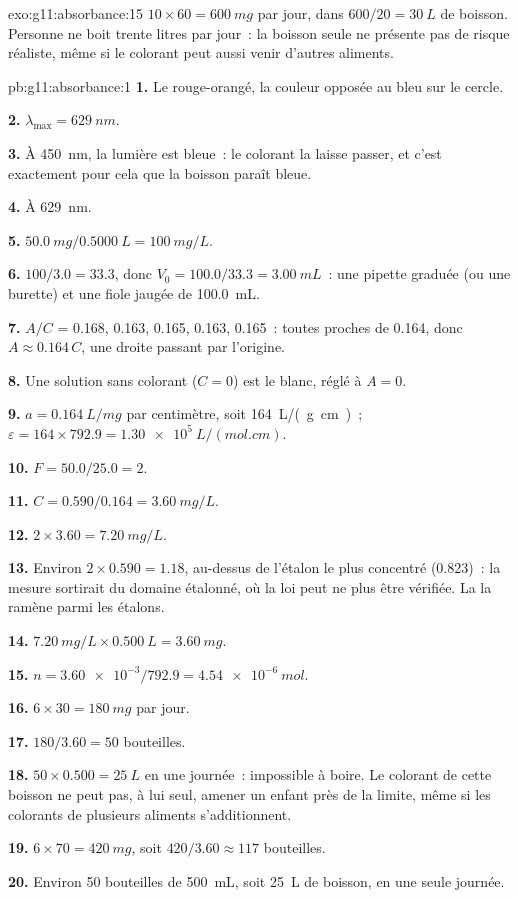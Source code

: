 \begin{solution}{exo:g11:absorbance:15}
$10 \times 60 = \qty{600}{mg}$ par jour, dans $600 / 20 = \qty{30}{L}$ de
boisson. Personne ne boit trente litres par jour~: la boisson seule ne
présente pas de risque réaliste, même si le colorant peut aussi venir
d'autres aliments.
\end{solution}

\begin{solution}{pb:g11:absorbance:1}
\textbf{1.} Le rouge-orangé, la couleur opposée au bleu sur le cercle.

\textbf{2.} $\lambda_{\max} = \qty{629}{nm}$.

\textbf{3.} À \qty{450}{nm}, la lumière est bleue~: le colorant la
laisse passer, et c'est exactement pour cela que la boisson paraît bleue.

\textbf{4.} À \qty{629}{nm}.

\textbf{5.} $\qty{50.0}{mg} / \qty{0.5000}{L} = \qty{100}{mg/L}$.

\textbf{6.}  $100 / 3.0 = 33.3$, donc
$V_0 = 100.0 / 33.3 = \qty{3.00}{mL}$~: une pipette graduée (ou une
burette) et une fiole jaugée de \qty{100.0}{mL}.

\textbf{7.} $A/C$ = 0.168, 0.163, 0.165, 0.163, 0.165~: toutes proches
de 0.164, donc $A \approx 0.164\, C$, une droite passant par l'origine.

\textbf{8.} Une solution sans colorant ($C = 0$) est le blanc, réglé à
$A = 0$.

\textbf{9.} $a = \qty{0.164}{L/mg}$ par centimètre, soit
\qty{164}{L/(g.cm)}~; $\varepsilon = 164 \times 792.9 =
\qty{1.30e5}{L/(mol.cm)}$.

\textbf{10.} $F = 50.0 / 25.0 = 2$.

\textbf{11.} $C = 0.590 / 0.164 = \qty{3.60}{mg/L}$.

\textbf{12.} $2 \times 3.60 = \qty{7.20}{mg/L}$.

\textbf{13.} Environ $2 \times 0.590 = 1.18$, au-dessus de l'étalon le
plus concentré (0.823)~: la mesure sortirait du domaine étalonné, où la
loi peut ne plus être vérifiée. La  la ramène parmi les
étalons.

\textbf{14.} $\qty{7.20}{mg/L} \times \qty{0.500}{L} = \qty{3.60}{mg}$.

\textbf{15.} $n = \num{3.60e-3} / 792.9 = \qty{4.54e-6}{mol}$.

\textbf{16.} $6 \times 30 = \qty{180}{mg}$ par jour.

\textbf{17.} $180 / 3.60 = 50$ bouteilles.

\textbf{18.} $50 \times 0.500 = \qty{25}{L}$ en une journée~: impossible
à boire. Le colorant de cette boisson ne peut pas, à lui seul, amener un
enfant près de la limite, même si les colorants de plusieurs aliments
s'additionnent.

\textbf{19.} $6 \times 70 = \qty{420}{mg}$, soit $420 / 3.60 \approx
117$ bouteilles.

\textbf{20.} Environ 50 bouteilles de \qty{500}{mL}, soit \qty{25}{L} de
boisson, en une seule journée.
\end{solution}
